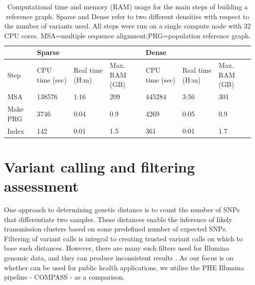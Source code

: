\begin{table}
\centering
\begin{tabularx}{\textwidth}{|l|X|X|X|X|X|X|}
\hline
         & \multicolumn{3}{l|}{Sparse}                          & \multicolumn{3}{l|}{Dense}                           \\ \hline
Step     & CPU time (sec) & Real time (H:m) & Max. RAM (GB) & CPU time (sec) & Real time (H:m) & Max. RAM (GB) \\ \hline%
MSA      & 138576         & 1:16             & 209              & 445284         & 3:56             & 301              \\ \hline%
Make PRG & 3746           & 0:04             & 0.9              & 4269           & 0:05             & 0.9              \\ \hline%
Index    & 142            & 0:01             & 1.5              & 361            & 0:01             & 1.7              \\ \hline%
\end{tabularx}
\caption{Computational time and memory (RAM) usage for the main steps of building a \mtb{} reference graph. Sparse and Dense refer to two different densities with respect to the number of variants used. All steps were run on a single compute node with 32 CPU cores. MSA=multiple sequence alignment;PRG=population reference graph.}
\label{tab:build-prg}
\end{table}


\section{Variant calling and filtering assessment}
\label{sec:var-calls}
One approach to determining genetic distance is to count the number of SNPs that differentiate two samples. These distances enable the inference of likely transmission clusters based on some predefined number of expected SNPs. Filtering of variant calls is integral to creating trusted variant calls on which to base such distances. However, there are many such filters used for Illumina genomic data, and they can produce inconsistent results \cite{walter2020}. As our focus is on whether \ont{} can be used for public health applications, we utilise the PHE Illumina pipeline - COMPASS \cite{Jajou2019} - as a comparison.

